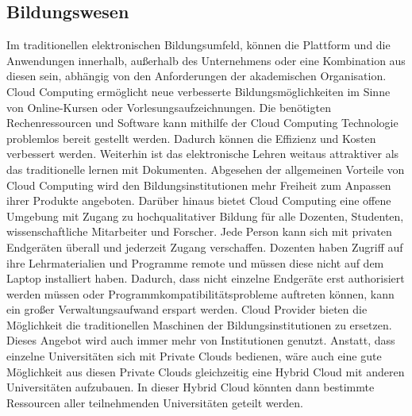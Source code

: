 \subsection{Bildungswesen}
Im traditionellen elektronischen Bildungsumfeld, können die Plattform und die Anwendungen innerhalb, außerhalb des Unternehmens oder eine Kombination aus diesen sein, abhängig von den Anforderungen der akademischen Organisation\cite{teaching}. Cloud Computing ermöglicht neue verbesserte Bildungsmöglichkeiten im Sinne von Online-Kursen oder Vorlesungsaufzeichnungen. Die benötigten Rechenressourcen und Software kann mithilfe der Cloud Computing Technologie problemlos bereit gestellt werden. Dadurch können die Effizienz und Kosten verbessert werden. Weiterhin ist das elektronische Lehren weitaus attraktiver als das traditionelle lernen mit Dokumenten\cite{teaching}.
Abgesehen der allgemeinen Vorteile von Cloud Computing wird den Bildungsinstitutionen mehr Freiheit zum Anpassen ihrer Produkte angeboten. Darüber hinaus bietet Cloud Computing eine offene Umgebung mit Zugang zu hochqualitativer Bildung für alle Dozenten, Studenten, wissenschaftliche Mitarbeiter und Forscher. Jede Person kann sich mit privaten Endgeräten überall und jederzeit Zugang verschaffen. Dozenten haben Zugriff auf ihre Lehrmaterialien und Programme remote und müssen diese nicht auf dem Laptop installiert haben. Dadurch, dass nicht einzelne Endgeräte erst authorisiert werden müssen oder Programmkompatibilitätsprobleme auftreten können, kann ein großer Verwaltungsaufwand erspart werden. Cloud Provider bieten die Möglichkeit die traditionellen Maschinen der Bildungsinstitutionen zu ersetzen. Dieses Angebot wird auch immer mehr von Institutionen genutzt. Anstatt, dass einzelne Universitäten sich mit Private Clouds bedienen, wäre auch eine gute Möglichkeit aus diesen Private Clouds gleichzeitig eine Hybrid Cloud mit anderen Universitäten aufzubauen. In dieser Hybrid Cloud könnten dann bestimmte Ressourcen aller teilnehmenden Universitäten geteilt werden\cite{recenttrends}.
